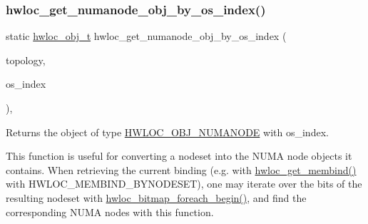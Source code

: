\subsubsection{\texorpdfstring{hwloc\+\_\+get\+\_\+numanode\+\_\+obj\+\_\+by\+\_\+os\+\_\+index()}{hwloc\_get\_numanode\_obj\_by\_os\_index()}}
{\footnotesize\ttfamily static \hyperlink{a00185_ga79b8ab56877ef99ac59b833203391c7d}{hwloc\+\_\+obj\+\_\+t} hwloc\+\_\+get\+\_\+numanode\+\_\+obj\+\_\+by\+\_\+os\+\_\+index (\begin{DoxyParamCaption}\item[{\hyperlink{a00186_ga9d1e76ee15a7dee158b786c30b6a6e38}{hwloc\+\_\+topology\+\_\+t}}]{topology,  }\item[{unsigned}]{os\+\_\+index }\end{DoxyParamCaption})\hspace{0.3cm}{\ttfamily [inline]}, {\ttfamily [static]}}



Returns the object of type \hyperlink{a00184_ggacd37bb612667dc437d66bfb175a8dc55a9d917a3e5497950c6d8948b8e183db5a}{H\+W\+L\+O\+C\+\_\+\+O\+B\+J\+\_\+\+N\+U\+M\+A\+N\+O\+DE} with {\ttfamily os\+\_\+index}. 

This function is useful for converting a nodeset into the N\+U\+MA node objects it contains. When retrieving the current binding (e.\+g. with \hyperlink{a00191_gae21f0a1a884929c784bebf070252aa56}{hwloc\+\_\+get\+\_\+membind()} with H\+W\+L\+O\+C\+\_\+\+M\+E\+M\+B\+I\+N\+D\+\_\+\+B\+Y\+N\+O\+D\+E\+S\+ET), one may iterate over the bits of the resulting nodeset with \hyperlink{a00205_ga3f6861045a8029ade373510ffa727d2a}{hwloc\+\_\+bitmap\+\_\+foreach\+\_\+begin()}, and find the corresponding N\+U\+MA nodes with this function. \mbox{\label{a00200_gacb51295ff3fbd3a96f990f20c6492b1d}} 
